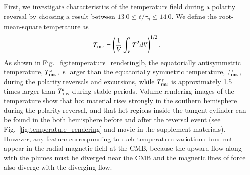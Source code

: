 First, we investigate characteristics of the temperature field during a polarity reversal by choosing a result between $13.0 \le t/\tau_{\eta} \le 14.0$. 
We define the root-mean-square temperature as
%
\begin{equation}
T_{\rm rms} = \left( \frac{1}{V}
  \int_V T^2 d V \right)^{1/2} .
\label{eq:Trms}
\end{equation}
%
As shown in Fig.~\ref{fig:temperature_rendering}b, the equatorially antisymmetric temperature, $T_{\rm rms}^a$, is larger than the equatorially symmetric temperature, $T_{\rm rms}^s$, during the polarity reversals and excursions, while $T_{\rm rms}^s$ is approximately 1.5 times larger than $T_{\rm rms}^a$ during stable periods.
Volume rendering images of the temperature show that hot material rises strongly in the southern hemisphere during the polarity reversal, and that hot regions inside the tangent cylinder can be found in the both hemisphere before and after the reversal event
(see Fig.~\ref{fig:temperature_rendering} and movie in the supplement materials). 
However, any feature corresponding to such temperature variations does not appear in the radial magnetic field at the CMB, 
because the upward flow along with the plumes must be diverged near the CMB and the magnetic lines of force also diverge with the diverging flow.

